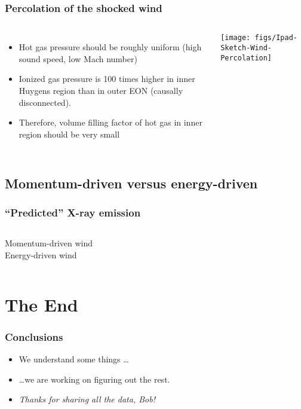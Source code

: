 \documentclass[presentation]{beamer}
\begin{document}
\begin{frame}
  \frametitle{Percolation of the shocked wind}
  \begin{columns}
    \begin{itemize}
    \item Hot gas pressure should be roughly uniform (high sound
      speed, low Mach number)
    \item Ionized gas pressure is 100 times higher in inner Huygens region
      than in outer EON (causally disconnected). 
    \item Therefore, volume filling factor of hot gas in inner region
      should be very small
    \end{itemize}
    \texttt{[image: figs/Ipad-Sketch-Wind-Percolation]} 
  \end{columns}
\end{frame}

\subsection{Momentum-driven versus energy-driven}
\setlength{}
\begin{frame}
  \frametitle{``Predicted'' X-ray emission}
  \begin{columns}
    Momentum-driven wind\\
    Energy-driven wind\\
  \end{columns}
\end{frame}

\section*{The End}

\begin{frame}
  \frametitle{Conclusions}
  \begin{itemize}
  \item We understand some things \dots
  \item \dots we are working on figuring out the rest.
  \item \emph{Thanks for sharing all the data, Bob!}
  \end{itemize}
\end{frame}
\end{document}

